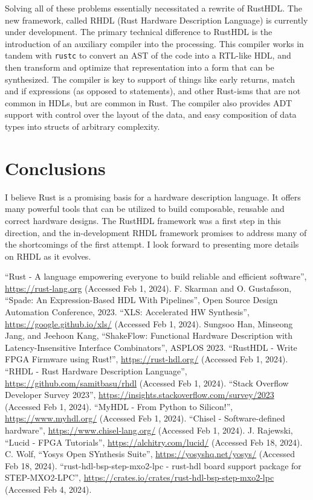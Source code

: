 \documentclass[sigplan,screen,sigconf]{acmart}
\begin{document}
Solving all of these problems essentially necessitated a rewrite of RustHDL.  The new framework, called RHDL (Rust Hardware Description Language) is currently under development.  The primary technical difference to RustHDL is the introduction of an auxiliary compiler into the processing. This compiler works in tandem with \verb|rustc| to convert an AST of the code into a RTL-like HDL, and then transform and optimize that representation into a form that can be synthesized.  The  compiler is key to support of things like early returns, match and if expressions (as opposed to statements), and other Rust-isms that are not common in HDLs, but are common in Rust.  The compiler also provides
ADT support with control over the layout of the data, and easy composition of data types into structs of arbitrary complexity.  

\section{Conclusions}
I believe Rust is a promising basis for a hardware description language.  It offers many powerful tools that can be utilized to build composable, reusable and correct hardware designs.  The RustHDL framework was a first step in this direction, and the in-development RHDL framework promises to address many of the shortcomings of the first attempt. I look forward to presenting more details on RHDL as it evolves.

\begin{thebibliography}{00}
   ``Rust - A language empowering everyone to build reliable and efficient software'', \url{https://rust-lang.org} (Accessed Feb 1, 2024).
   F. Skarman and O. Gustafsson, ``Spade: An Expression-Based HDL With Pipelines'', Open Source Design Automation Conference, 2023.
   ``XLS: Accelerated HW Synthesis'', \url{https://google.github.io/xls/} (Accessed Feb 1, 2024).
   Sungsoo Han, Minseong Jang, and Jeehoon Kang, ``ShakeFlow: Functional Hardware Description with Latency-Insensitive Interface Combinators'', ASPLOS 2023.
   ``RustHDL - Write FPGA Firmware using Rust!'', \url{https://rust-hdl.org/} (Accessed Feb 1, 2024).
   ``RHDL - Rust Hardware Description Language'', \url{https://github.com/samitbasu/rhdl} (Accessed Feb 1, 2024).
   ``Stack Overflow Developer Survey 2023'', \url{https://insights.stackoverflow.com/survey/2023} (Accessed Feb 1, 2024).
   ``MyHDL - From Python to Silicon!'', \url{https://www.myhdl.org/} (Accessed Feb 1, 2024).
   ``Chisel - Software-defined hardware'', \url{https://www.chisel-lang.org/} (Accessed Feb 1, 2024).
   J. Rajewski, ``Lucid - FPGA Tutorials'', \url{https://alchitry.com/lucid/} (Accessed Feb 18, 2024).
   C. Wolf, ``Yosys Open SYnthesis Suite'', \url{https://yosyshq.net/yosys/} (Accessed Feb 18, 2024).
   ``rust-hdl-bsp-step-mxo2-lpc - rust-hdl board support package for STEP-MXO2-LPC'', \url{https://crates.io/crates/rust-hdl-bsp-step-mxo2-lpc} (Accessed Feb 4, 2024).
\end{thebibliography}
\end{document}
